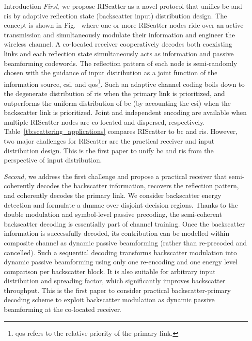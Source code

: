 \documentclass[journal]{IEEEtran}
\begin{document}
\begin{section}{Introduction}
	\emph{First,} we propose RIScatter as a novel protocol that unifies \gls{bc} and \gls{ris} by adaptive reflection state (backscatter input) distribution design.
	The concept is shown in Fig.~ where one or more RIScatter nodes ride over an active transmission and simultaneously modulate their information and engineer the wireless channel.
	A co-located receiver cooperatively decodes both coexisting links and each reflection state simultaneously acts as information and passive beamforming codewords.
	The reflection pattern of each node is semi-randomly chosen with the guidance of input distribution as a joint function of the information source, \gls{csi}, and \gls{qos}\footnote{\gls{qos} refers to the relative priority of the primary link.}.
	Such an adaptive channel coding boils down to the degenerate distribution of \gls{ris} when the primary link is prioritized, and outperforms the uniform distribution of \gls{bc} (by accounting the \gls{csi}) when the backscatter link is prioritized.
	Joint and independent encoding are available when multiple RIScatter nodes are co-located and dispersed, respectively.
	Table~\ref{tb:scattering_applications} compares RIScatter to \gls{bc} and \gls{ris}.
	However, two major challenges for RIScatter are the practical receiver and input distribution design.
	This is the first paper to unify \gls{bc} and \gls{ris} from the perspective of input distribution.

	\emph{Second,} we address the first challenge and propose a practical receiver that semi-coherently decodes the backscatter information, recovers the reflection pattern, and coherently decodes the primary link.
	We consider backscatter energy detection and formulate a \gls{dmmac} over disjoint decision regions.
	Thanks to the double modulation and symbol-level passive precoding, the semi-coherent backscatter decoding is essentially part of channel training.
	Once the backscatter information is successfully decoded, its contribution can be modelled within composite channel as dynamic passive beamforming (rather than re-precoded and cancelled).
	Such a sequential decoding transforms backscatter modulation into dynamic passive beamforming using only one re-encoding and one energy level comparison per backscatter block.
	It is also suitable for arbitrary input distribution and spreading factor, which significantly improves backscatter throughput.
	This is the first paper to consider practical backscatter-primary decoding scheme to exploit backscatter modulation as dynamic passive beamforming at the co-located receiver.


\end{section}
\end{document}
